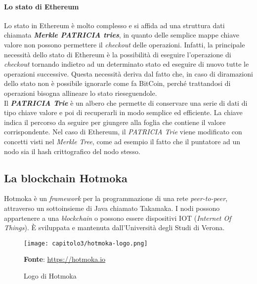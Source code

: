 \paragraph{Lo stato di Ethereum}
Lo stato in Ethereum è molto complesso e si affida ad una struttura dati chiamata \textit{\textbf{Merkle PATRICIA tries}}, in quanto delle semplice mappe chiave valore non possono permettere il \textit{checkout} delle operazioni. Infatti, la principale necessità dello stato di Ethereum è la possibilità di eseguire l'operazione di \textit{checkout} tornando indietro ad un determinato stato ed eseguire di nuovo tutte le operazioni successive. Questa necessità deriva dal fatto che, in caso di diramazioni dello stato non è possibile ignorarle come fa BitCoin, perché trattandosi di operazioni bisogna allineare lo stato rieseguendole. \\

Il \textbf{\textit{PATRICIA Trie}} è un albero che permette di conservare una serie di dati di tipo chiave valore e poi di recuperarli in modo semplice ed efficiente. La chiave indica il percorso da seguire per giungere alla foglia che contiene il valore corrispondente. Nel caso di Ethereum, il \textit{PATRICIA Trie} viene modificato con concetti visti nel \textit{Merkle Tree}, come ad esempio il fatto che il puntatore ad un nodo sia il hash crittografico del nodo stesso.


\subsection{La blockchain Hotmoka}
Hotmoka è un \textit{framework} per la programmazione di una rete \textit{peer-to-peer}, attraverso un sottoinsieme di Java chiamato Takamaka. I nodi possono appartenere a una \textit{blockchain} o possono essere dispositivi IOT (\textit{Internet Of Things}). È sviluppata e mantenuta dall'Università degli Studi di Verona.

\begin{figure}[h!]
  \centering
  \texttt{[image: capitolo3/hotmoka-logo.png]}
  \caption{Logo di Hotmoka}
  \textbf{Fonte}: \href{https://hotmoka.io}{https://hotmoka.io}
\end{figure}

